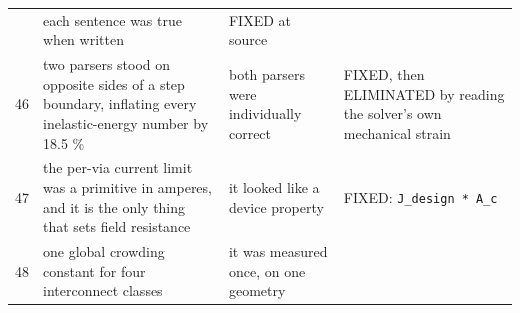 \documentclass[10pt,]{article}
\begin{document}
\begin{longtable}[]{@{}llll@{}}
\begin{minipage}[t]{0.22\columnwidth}
\end{minipage} & \begin{minipage}[t]{0.22\columnwidth}\raggedright
each sentence was true when written\strut
\end{minipage} & \begin{minipage}[t]{0.22\columnwidth}\raggedright
FIXED at source\strut
\end{minipage}\tabularnewline
\begin{minipage}[t]{0.22\columnwidth}\raggedright
46\strut
\end{minipage} & \begin{minipage}[t]{0.22\columnwidth}\raggedright
two parsers stood on opposite sides of a step boundary, inflating every
inelastic-energy number by 18.5 \%\strut
\end{minipage} & \begin{minipage}[t]{0.22\columnwidth}\raggedright
both parsers were individually correct\strut
\end{minipage} & \begin{minipage}[t]{0.22\columnwidth}\raggedright
FIXED, then ELIMINATED by reading the solver's own mechanical
strain\strut
\end{minipage}\tabularnewline
\begin{minipage}[t]{0.22\columnwidth}\raggedright
47\strut
\end{minipage} & \begin{minipage}[t]{0.22\columnwidth}\raggedright
the per-via current limit was a primitive in amperes, and it is the only
thing that sets field resistance\strut
\end{minipage} & \begin{minipage}[t]{0.22\columnwidth}\raggedright
it looked like a device property\strut
\end{minipage} & \begin{minipage}[t]{0.22\columnwidth}\raggedright
FIXED: \texttt{J\_design\ *\ A\_c}\strut
\end{minipage}\tabularnewline
\begin{minipage}[t]{0.22\columnwidth}\raggedright
48\strut
\end{minipage} & \begin{minipage}[t]{0.22\columnwidth}\raggedright
one global crowding constant for four interconnect classes\strut
\end{minipage} & \begin{minipage}[t]{0.22\columnwidth}\raggedright
it was measured once, on one geometry\strut
\end{minipage} & \begin{minipage}[t]{0.22\columnwidth}\raggedright

\end{minipage}
\end{longtable}
\end{document}
